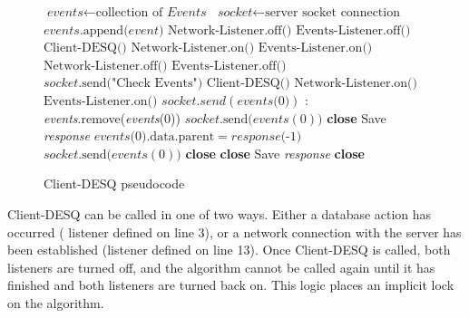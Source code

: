 \begin{center}
\begin{figure}[ht]
\begin{algorithmic}[1]
\State $\textit{events} \gets \text{collection of }\textit{Events}$
\State $\textit{socket} \gets \text{server socket connection}$
\State $events\text{.append(}event\text{)}$
\EndOn
\EndListene
{}
\State $\text{Network-Listener.off()}$
\State $\text{Events-Listener.off()}$
\State $\text{Client-DESQ()}$
\State $\text{Network-Listener.on()}$
\State $\text{Events-Listener.on()}$
\EndOn
\EndListene
{}
\State $\text{Network-Listener.off()}$
\State $\text{Events-Listener.off()}$
\State $socket\text{.send("Check Events")}$
\State $\text{Client-DESQ()}$
\State $\text{Network-Listener.on()}$
\State $\text{Events-Listener.on()}$
\EndOn
\EndListene
{}
\State $socket.send(events\text{(0)})$
\EndIf
{}:
\State \emph{events}.remove(\emph{events}(0))
\State $socket\text{.send(}events(0)\text{)}$
\EndIf
\State \textbf{close}
\EndIf
{}
\State Save \emph{response} 
\State $events\text{(0).data.parent} = response\text{(-1)}$ 
\State $socket\text{.send(}events(0)\text{)}$
\State \textbf{close}
\EndIf
{}
\State \textbf{close}
\EndIf
\State Save \emph{response}
\State \textbf{close}
\EndIf
\EndOn
\EndProcedure
\end{algorithmic}
\caption{Client-DESQ pseudocode}\label{euclid}
\end{figure}
\end{center}

Client-DESQ can be called in one of two ways. Either a database action has occurred ( listener defined on line 3), or a network connection with the server has been established (listener defined on line 13). Once Client-DESQ is called, both listeners are turned off, and the algorithm cannot be called again until it has finished and both listeners are turned back on. This logic places an implicit lock on the algorithm.

